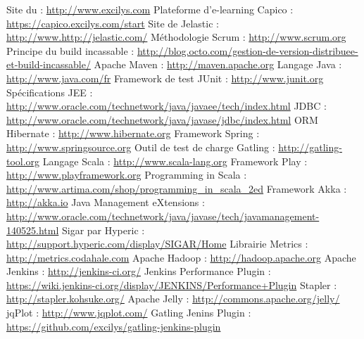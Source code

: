 \begin{thebibliography}{2}
	
	 Site du \excilysGroup{} : \url{http://www.excilys.com}
	 Plateforme d'e-learning Capico : \url{https://capico.excilys.com/start}
	 Site de Jelastic : \url{http://www.http://jelastic.com/}
	 Méthodologie Scrum : \url{http://www.scrum.org}
	 Principe du build incassable : \url{http://blog.octo.com/gestion-de-version-distribuee-et-build-incassable/}
	 Apache Maven : \url{http://maven.apache.org}
	 Langage Java : \url{http://www.java.com/fr}
	 Framework de test JUnit : \url{http://www.junit.org}
	 Spécifications JEE : \url{http://www.oracle.com/technetwork/java/javaee/tech/index.html}
	 JDBC : \url{http://www.oracle.com/technetwork/java/javase/jdbc/index.html}
	 ORM Hibernate : \url{http://www.hibernate.org}
	 Framework Spring : \url{http://www.springsource.org}
	 Outil de test de charge Gatling : \url{http://gatling-tool.org}
	 Langage Scala : \url{http://www.scala-lang.org}
	 Framework Play : \url{http://www.playframework.org}
	 Programming in Scala : \url{http://www.artima.com/shop/programming_in_scala_2ed}
	 Framework Akka : \url{http://akka.io}
	 Java Management eXtensions : \url{http://www.oracle.com/technetwork/java/javase/tech/javamanagement-140525.html}
	 Sigar par Hyperic : \url{http://support.hyperic.com/display/SIGAR/Home}
	 Librairie Metrics : \url{http://metrics.codahale.com}
	 Apache Hadoop : \url{http://hadoop.apache.org}
	 Apache Jenkins : \url{http://jenkins-ci.org/}
	 Jenkins Performance Plugin : \url{https://wiki.jenkins-ci.org/display/JENKINS/Performance+Plugin}
	 Stapler : \url{http://stapler.kohsuke.org/}
	 Apache Jelly : \url{http://commons.apache.org/jelly/}
	 jqPlot : \url{http://www.jqplot.com/}
	 Gatling Jenins Plugin : \url{https://github.com/excilys/gatling-jenkins-plugin}
\end{thebibliography}
